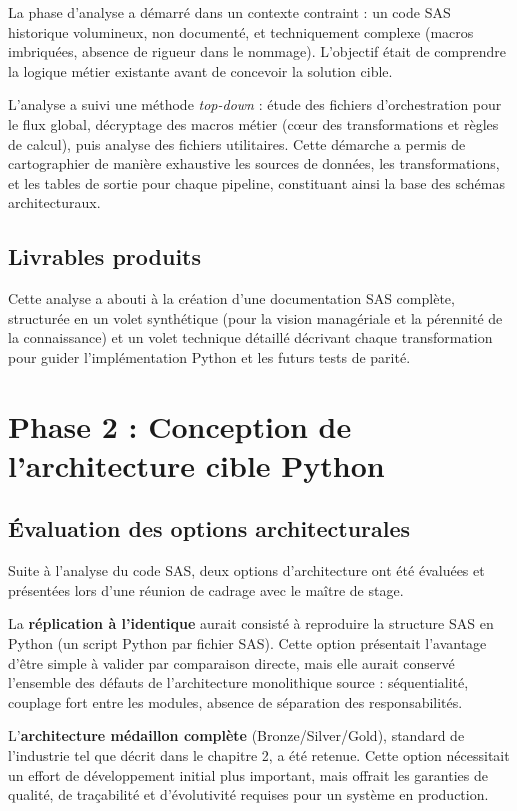 La phase d'analyse a démarré dans un contexte contraint : un code SAS historique volumineux, non documenté, et techniquement complexe (macros imbriquées, absence de rigueur dans le nommage). L'objectif était de comprendre la logique métier existante avant de concevoir la solution cible.

L'analyse a suivi une méthode \textit{top-down} : étude des fichiers d'orchestration pour le flux global, décryptage des macros métier (cœur des transformations et règles de calcul), puis analyse des fichiers utilitaires. Cette démarche a permis de cartographier de manière exhaustive les sources de données, les transformations, et les tables de sortie pour chaque pipeline, constituant ainsi la base des schémas architecturaux.

\subsection{Livrables produits}

Cette analyse a abouti à la création d'une documentation SAS complète, structurée en un volet synthétique (pour la vision managériale et la pérennité de la connaissance) et un volet technique détaillé décrivant chaque transformation pour guider l'implémentation Python et les futurs tests de parité.

\section{Phase 2 : Conception de l'architecture cible Python}

\subsection{Évaluation des options architecturales}

Suite à l'analyse du code SAS, deux options d'architecture ont été évaluées et présentées lors d'une réunion de cadrage avec le maître de stage.

La \textbf{réplication à l'identique} aurait consisté à reproduire la structure SAS en Python (un script Python par fichier SAS). Cette option présentait l'avantage d'être simple à valider par comparaison directe, mais elle aurait conservé l'ensemble des défauts de l'architecture monolithique source : séquentialité, couplage fort entre les modules, absence de séparation des responsabilités.

L'\textbf{architecture médaillon complète} (Bronze/Silver/Gold), standard de l'industrie tel que décrit dans le chapitre 2, a été retenue. Cette option nécessitait un effort de développement initial plus important, mais offrait les garanties de qualité, de traçabilité et d'évolutivité requises pour un système en production.

